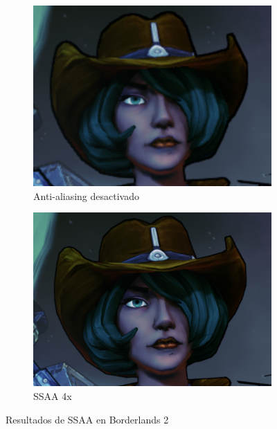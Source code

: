 \documentclass[withindex, glossary]{cam-thesis}
\begin{document}
\begin{figure}[!htbp]
    \centering
    \begin{subfigure}[b]{0.8\textwidth}
        \includegraphics[width=\textwidth]{figures/ss1off.png}
        \caption{Anti-aliasing desactivado}
    \end{subfigure}
    \centering
    \begin{subfigure}[b]{0.8\textwidth}
        \includegraphics[width=\textwidth]{figures/ss1on.png}
        \caption{SSAA 4x}
    \end{subfigure}
    \caption{Resultados de SSAA en Borderlands 2}
    \label{ss1}
\end{figure}
\end{document}
